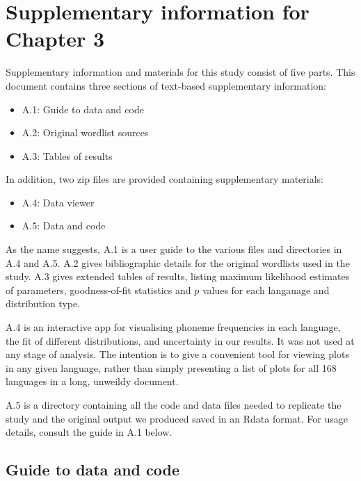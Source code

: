 \chapter{Supplementary information for Chapter 3}

Supplementary information and materials for this study consist of five
parts. This document contains three sections of text-based supplementary
information:

\begin{itemize}
\tightlist
\item
  A.1: Guide to data and code
\item
  A.2: Original wordlist sources
\item
  A.3: Tables of results
\end{itemize}

In addition, two zip files are provided containing supplementary
materials:

\begin{itemize}
\tightlist
\item
  A.4: Data viewer
\item
  A.5: Data and code
\end{itemize}

As the name suggests, A.1 is a user guide to the various files and
directories in A.4 and A.5. A.2 gives bibliographic details for the
original wordlists used in the study. A.3 gives extended tables of
results, listing maximum likelihood estimates of parameters,
goodness-of-fit statistics and \(p\) values for each langauage and
distribution type.

A.4 is an interactive app for visualising phoneme frequencies in each
language, the fit of different distributions, and uncertainty in our
results. It was not used at any stage of analysis. The intention is to
give a convenient tool for viewing plots in any given language, rather
than simply presenting a list of plots for all 168 languages in a long,
unweildy document.

A.5 is a directory containing all the code and data files needed to
replicate the study and the original output we produced saved in an
Rdata format. For usage details, consult the guide in A.1 below.

\hypertarget{guide-to-data-and-code}{%
\section{Guide to data and code}\label{guide-to-data-and-code}}

